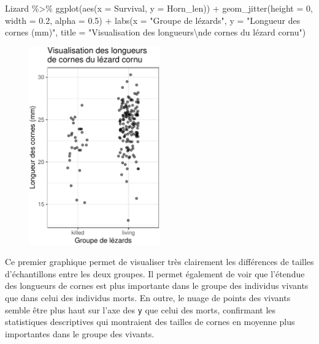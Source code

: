\documentclass[
  a4paper,
  DIV=11,
  numbers=noendperiod,
  oneside]{scrreprt}
\newenvironment{Shaded}{}{}
\newcommand{\AttributeTok}[1]{\textcolor[rgb]{0.84,0.23,0.29}{#1}}
\newcommand{\DecValTok}[1]{\textcolor[rgb]{0.00,0.36,0.77}{#1}}
\newcommand{\FloatTok}[1]{\textcolor[rgb]{0.00,0.36,0.77}{#1}}
\newcommand{\FunctionTok}[1]{\textcolor[rgb]{0.44,0.26,0.76}{#1}}
\newcommand{\NormalTok}[1]{\textcolor[rgb]{0.14,0.16,0.18}{#1}}
\newcommand{\SpecialCharTok}[1]{\textcolor[rgb]{0.00,0.36,0.77}{#1}}
\newcommand{\StringTok}[1]{\textcolor[rgb]{0.01,0.18,0.38}{#1}}
\begin{document}
\begin{Shaded}
\begin{Highlighting}[]
\NormalTok{Lizard }\SpecialCharTok{\%\textgreater{}\%}
  \FunctionTok{ggplot}\NormalTok{(}\FunctionTok{aes}\NormalTok{(}\AttributeTok{x =}\NormalTok{ Survival, }\AttributeTok{y =}\NormalTok{ Horn\_len)) }\SpecialCharTok{+}
  \FunctionTok{geom\_jitter}\NormalTok{(}\AttributeTok{height =} \DecValTok{0}\NormalTok{, }\AttributeTok{width =} \FloatTok{0.2}\NormalTok{, }\AttributeTok{alpha =} \FloatTok{0.5}\NormalTok{) }\SpecialCharTok{+}
  \FunctionTok{labs}\NormalTok{(}\AttributeTok{x =} \StringTok{"Groupe de lézards"}\NormalTok{,}
       \AttributeTok{y =} \StringTok{"Longueur des cornes (mm)"}\NormalTok{,}
       \AttributeTok{title =} \StringTok{"Visualisation des longueurs}\SpecialCharTok{\textbackslash{}n}\StringTok{de cornes du lézard cornu"}\NormalTok{)}
\end{Highlighting}
\end{Shaded}

\begin{figure}[H]

{\centering \includegraphics[width=0.5\textwidth,height=\textheight]{03-TwoSampleTests_files/figure-pdf/unnamed-chunk-11-1.pdf}

}

\end{figure}

Ce premier graphique permet de visualiser très clairement les
différences de tailles d'échantillons entre les deux groupes. Il permet
également de voir que l'étendue des longueurs de cornes est plus
importante dans le groupe des individus vivants que dans celui des
individus morts. En outre, le nuage de points des vivants semble être
plus haut sur l'axe des \texttt{y} que celui des morts, confirmant les
statistiques descriptives qui montraient des tailles de cornes en
moyenne plus importantes dans le groupe des vivants.
\end{document}
